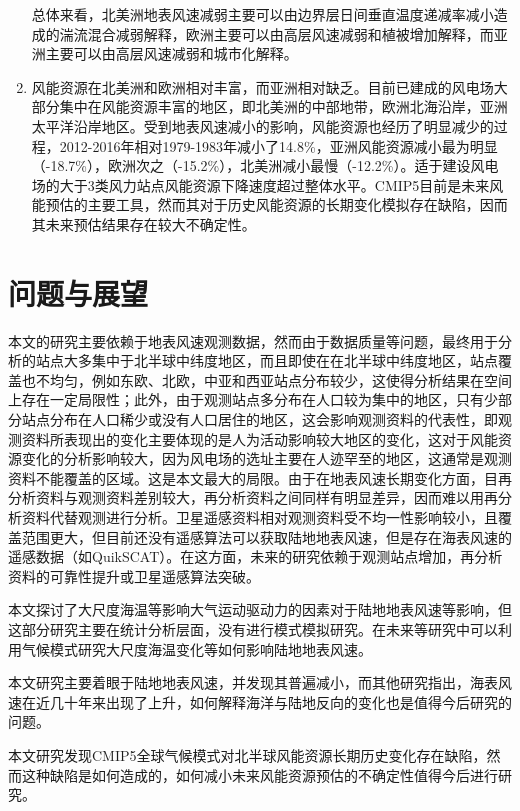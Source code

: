 \begin{enumerate}
总体来看，北美洲地表风速减弱主要可以由边界层日间垂直温度递减率减小造成的湍流混合减弱解释，欧洲主要可以由高层风速减弱和植被增加解释，而亚洲主要可以由高层风速减弱和城市化解释。

\item 风能资源在北美洲和欧洲相对丰富，而亚洲相对缺乏。目前已建成的风电场大部分集中在风能资源丰富的地区，即北美洲的中部地带，欧洲北海沿岸，亚洲太平洋沿岸地区。受到地表风速减小的影响，风能资源也经历了明显减少的过程，2012-2016年相对1979-1983年减小了14.8\%，亚洲风能资源减小最为明显（-18.7\%），欧洲次之（-15.2\%），北美洲减小最慢（-12.2\%）。适于建设风电场的大于3类风力站点风能资源下降速度超过整体水平。CMIP5目前是未来风能预估的主要工具，然而其对于历史风能资源的长期变化模拟存在缺陷，因而其未来预估结果存在较大不确定性。

\end{enumerate}

\section{问题与展望}

本文的研究主要依赖于地表风速观测数据，然而由于数据质量等问题，最终用于分析的站点大多集中于北半球中纬度地区，而且即使在在北半球中纬度地区，站点覆盖也不均匀，例如东欧、北欧，中亚和西亚站点分布较少，这使得分析结果在空间上存在一定局限性；此外，由于观测站点多分布在人口较为集中的地区，只有少部分站点分布在人口稀少或没有人口居住的地区，这会影响观测资料的代表性，即观测资料所表现出的变化主要体现的是人为活动影响较大地区的变化，这对于风能资源变化的分析影响较大，因为风电场的选址主要在人迹罕至的地区，这通常是观测资料不能覆盖的区域。这是本文最大的局限。由于在地表风速长期变化方面，目再分析资料与观测资料差别较大，再分析资料之间同样有明显差异，因而难以用再分析资料代替观测进行分析。卫星遥感资料相对观测资料受不均一性影响较小，且覆盖范围更大，但目前还没有遥感算法可以获取陆地地表风速，但是存在海表风速的遥感数据（如QuikSCAT）。在这方面，未来的研究依赖于观测站点增加，再分析资料的可靠性提升或卫星遥感算法突破。

本文探讨了大尺度海温等影响大气运动驱动力的因素对于陆地地表风速等影响，但这部分研究主要在统计分析层面，没有进行模式模拟研究。在未来等研究中可以利用气候模式研究大尺度海温变化等如何影响陆地地表风速。

本文研究主要着眼于陆地地表风速，并发现其普遍减小，而其他研究指出，海表风速在近几十年来出现了上升，如何解释海洋与陆地反向的变化也是值得今后研究的问题。

本文研究发现CMIP5全球气候模式对北半球风能资源长期历史变化存在缺陷，然而这种缺陷是如何造成的，如何减小未来风能资源预估的不确定性值得今后进行研究。

